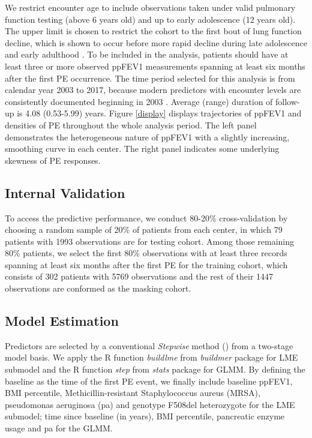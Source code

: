 We restrict encounter age to include observations taken under valid pulmonary function testing (above 6 years old) and up to early adolescence (12 years old). The upper limit is chosen to restrict the cohort to the first bout of lung function decline, which is shown to occur before more rapid decline during late adolescence and early adulthood \cite{Szczesniak2014}. To be included in the analysis, patients should have at least three or more observed ppFEV1 measurements spanning at least six months after the first PE occurrence. The time period selected for this analysis is from calendar year 2003 to 2017, because modern predictors with encounter levels are consistently documented beginning in 2003 \cite{Knapp2016}. Average (range) duration of follow-up is 4.08 (0.53-5.99) years. Figure \ref{display} displays trajectories of ppFEV1 and densities of PE throughout the whole analysis period. The left panel demonstrates the heterogeneous nature of ppFEV1 with a slightly increasing, smoothing curve in each center. The right panel indicates some underlying skewness of PE responses. 

\subsection{Internal Validation}

To access the predictive performance, we conduct 80-20\% cross-validation by choosing a random sample of 20\% of patients from each center, in which 79 patients with 1993 observations are for testing cohort. Among those remaining 80\% patients, we select the first 80\% observations with at least three records spanning at least six months after the first PE for the training cohort, which consists of 302 patients with 5769 observations and the rest of their 1447 observations are conformed as the masking cohort.

\subsection{Model Estimation}

Predictors are selected by a conventional \emph{Stepwise} method (\cite{Hocking1976}) from a two-stage model basis. We apply the R function \emph{buildlme} from \emph{buildmer} package \cite{buildmer2021} for LME submodel and the R function \emph{step} from \emph{stats} package \cite{R2020} for GLMM. By defining the baseline as the time of the first PE event, we finally include baseline ppFEV1, BMI percentile, Methicillin-resistant Staphylococcus aureus (MRSA), pseudomonas aeruginosa (pa) and genotype F508del heterozygote for the LME submodel; time since baseline (in years), BMI percentile, pancreatic enzyme usage and pa for the GLMM.

